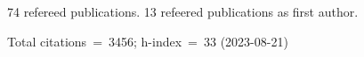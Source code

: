74 refereed publications. 13 refeered publications as first author.

Total citations~=~3456; h-index~=~33 (2023-08-21)
